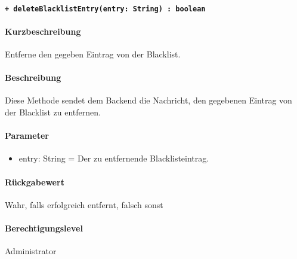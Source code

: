\paragraph{\texttt{+ deleteBlacklistEntry(entry: String) : boolean}}\label{AP_Framework_deleteBlacklistEntry}%
\paragraph*{Kurzbeschreibung}
Entferne den gegeben Eintrag von der Blacklist.
\paragraph*{Beschreibung}
Diese Methode sendet dem Backend die Nachricht, den gegebenen Eintrag von der Blacklist zu entfernen.
\paragraph*{Parameter}
\begin{itemize}
    \item entry: String = Der zu entfernende Blacklisteintrag.
\end{itemize}
\paragraph*{Rückgabewert}
Wahr, falls erfolgreich entfernt, falsch sonst
\paragraph*{Berechtigungslevel}
Administrator
